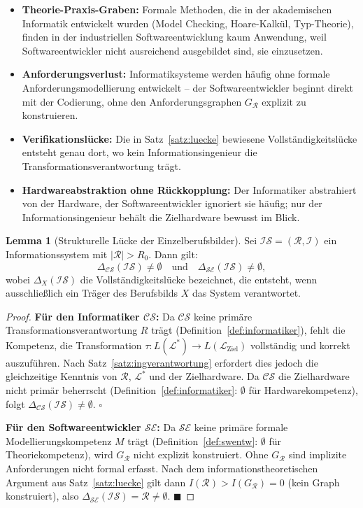 ﻿\documentclass[a4paper,12pt]{report}
\theoremstyle{definition}
\newtheorem{lemma}{Lemma}[section]
\begin{document}
\begin{itemize}
  \item \textbf{Theorie-Praxis-Graben:} Formale Methoden, die in der akademischen
        Informatik entwickelt wurden (Model Checking, Hoare-Kalkül, Typ-Theorie),
        finden in der industriellen Softwareentwicklung kaum Anwendung,
        weil Softwareentwickler nicht ausreichend ausgebildet sind, sie einzusetzen.
  \item \textbf{Anforderungsverlust:} Informatiksysteme werden häufig ohne
        formale Anforderungsmodellierung entwickelt -- der Softwareentwickler
        beginnt direkt mit der Codierung, ohne den Anforderungsgraphen
        $G_\mathcal{R}$ explizit zu konstruieren.
  \item \textbf{Verifikationslücke:} Die in Satz~\ref{satz:luecke} bewiesene
        Vollständigkeitslücke entsteht genau dort, wo kein Informationsingenieur
        die Transformationsverantwortung trägt.
  \item \textbf{Hardwareabstraktion ohne Rückkopplung:} Der Informatiker abstrahiert
        von der Hardware, der Softwareentwickler ignoriert sie häufig; nur der
        Informationsingenieur behält die Zielhardware bewusst im Blick.
\end{itemize}

\begin{lemma}[Strukturelle Lücke der Einzelberufsbilder]
\label{lem:luecke_berufe}
Sei $\mathcal{IS} = (\mathcal{R}, \mathcal{I})$ ein Informationssystem mit
$|\mathcal{R}| > R_0$. Dann gilt:
\[
  \Delta_{\mathcal{CS}}(\mathcal{IS}) \neq \emptyset
  \quad \text{und} \quad
  \Delta_{\mathcal{SE}}(\mathcal{IS}) \neq \emptyset,
\]
wobei $\Delta_X(\mathcal{IS})$ die Vollständigkeitslücke bezeichnet, die entsteht,
wenn ausschließlich ein Träger des Berufsbilds $X$ das System verantwortet.
\end{lemma}

\begin{proof}
\textbf{Für den Informatiker $\mathcal{CS}$:}
Da $\mathcal{CS}$ keine primäre Transformationsverantwortung $R$ trägt
(Definition~\ref{def:informatiker}), fehlt die Kompetenz, die Transformation
$\tau: L(\mathcal{L}^*) \to L(\mathcal{L}_{\text{Ziel}})$ vollständig und korrekt
auszuführen. Nach Satz~\ref{satz:ingverantwortung} erfordert dies jedoch die
gleichzeitige Kenntnis von $\mathcal{R}$, $\mathcal{L}^*$ und der Zielhardware.
Da $\mathcal{CS}$ die Zielhardware nicht primär beherrscht
(Definition~\ref{def:informatiker}: $\emptyset$ für Hardwarekompetenz), folgt
$\Delta_{\mathcal{CS}}(\mathcal{IS}) \neq \emptyset$. $\square$

\textbf{Für den Softwareentwickler $\mathcal{SE}$:}
Da $\mathcal{SE}$ keine primäre formale Modellierungskompetenz $M$ trägt
(Definition~\ref{def:swentw}: $\emptyset$ für Theoriekompetenz), wird
$G_\mathcal{R}$ nicht explizit konstruiert. Ohne $G_\mathcal{R}$ sind
implizite Anforderungen nicht formal erfasst. Nach dem informationstheoretischen
Argument aus Satz~\ref{satz:luecke} gilt dann
$I(\mathcal{R}) > I(G_\mathcal{R}) = 0$ (kein Graph konstruiert), also
$\Delta_{\mathcal{SE}}(\mathcal{IS}) = \mathcal{R} \neq \emptyset$. $\blacksquare$
\end{proof}
\end{document}
